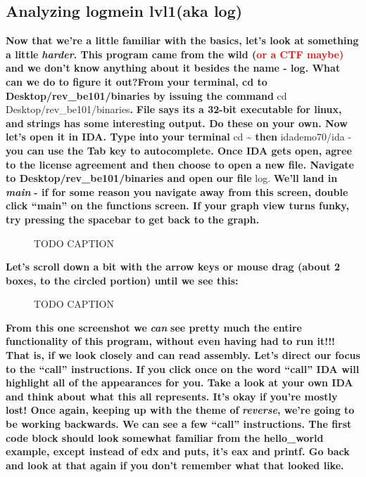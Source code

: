 \documentclass[letterpaper]{article}
\newcommand{\sitfig}[3]{
\begin{figure}[H]
\centering
\makebox[\textwidth][c]{
#2
}
\caption{#3}
\label{#1}
\end{figure}
}
\newcommand{\sitgfx}[4][scale=1.0]{
\sitfig{#3}{\texttt{[image: \#2]}}{#4}
}
\begin{document}
\subsection{Analyzing logmein lvl1(aka log)}

\textbf{Now that we're a little familiar with the basics, let's look at something a little
}\textbf{\textit{harder}}\textbf{. This program came from the wild (}\textbf{\textcolor{red}{or a CTF maybe)}}\textbf{
and we don't know anything about it besides the name - log. What can we do to figure it out?From your terminal, cd to
Desktop/rev\_be101/binaries by issuing the command }cd Desktop/rev\_be101/binaries\textbf{.
}\textbf{\textcolor[rgb]{0.21960784,0.4627451,0.11372549}{File }}\textbf{says its a 32-bit executable for linux, and
}\textbf{\textcolor[rgb]{0.21960784,0.4627451,0.11372549}{strings }}\textbf{has some interesting output. Do these on
your own. \newline
\newline
Now let's open it in IDA. Type into your terminal }cd \~{} \textbf{then }idademo70/ida -\textbf{you can use the Tab key
to autocomplete. Once IDA gets open, agree to the license agreement and then choose to open a new file. Navigate to
Desktop/rev\_be101/binaries and open our file }log. \textbf{We'll land in }\textbf{\textit{main }}\textbf{ {}- if for
some reason you navigate away from this screen, double click ``main'' on the functions screen. If your graph view turns
funky, try pressing the spacebar to get back to the graph.}  
\sitgfx[width=6.5in,height=3.2638in]{FINALWORKINGDOCFORMERLYPRECURSOR-img012.png}{fig:unk}{TODO CAPTION}
 

\textbf{Let's scroll down a bit with the arrow keys or mouse drag (about 2 boxes, to the circled portion) until we see
this:  }

  
\sitgfx[width=6.5in,height=3.4862in]{FINALWORKINGDOCFORMERLYPRECURSOR-img013.png}{fig:unk}{TODO CAPTION}
 

\textbf{From this one screenshot we }\textbf{\textit{can}}\textbf{ see pretty much the entire functionality of this
program, without even having had to run it!!! That is, if we look closely and can read assembly. Let's direct our focus
to the ``call'' instructions. If you click once on the word ``call'' IDA will highlight all of the appearances for you.
Take a look at your own IDA and think about what this all represents. It's okay if you're mostly lost! Once again,
keeping up with the theme of }\textbf{\textit{reverse}}\textbf{, we're going to be working backwards. \newline
\newline
We can see a few ``call'' instructions. The first code block should look somewhat familiar from the hello\_world
example, except instead of edx and puts, it's eax and printf. Go back and look at that again if you don't remember what
that looked like.}
\end{document}
